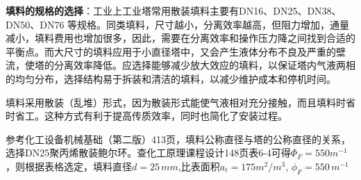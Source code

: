 \textbf{填料的规格的选择}：工业上工业塔常用散装填料主要有DN16、DN25、DN38、DN50、DN76 等规格。同类填料，尺寸越小，分离效率越高，但阻力增加，通量减小，填料费用也增加很多，因此，需要在分离效率和操作压力降之间找到合适的平衡点。而大尺寸的填料应用于小直径塔中，又会产生液体分布不良及严重的壁流，使塔的分离效率降低。应选择能够减少放大效应的填料，以保证塔内气液两相的均匀分布，选择结构易于拆装和清洁的填料，以减少维护成本和停机时间。

填料采用散装（乱堆）形式，因为散装形式能使气液相对充分接触，而且填料时省时省工。这种方式有利于提高传质效率，同时也简化了安装过程。

参考化工设备机械基础（第二版）413页，填料公称直径与塔的公称直径的关系，选择DN25聚丙烯散装鲍尔环。查化工原理课程设计148页表6-4可得$Φ_{F}=550 m^{-1} $，则根据表格选定，填料直径$d=25\,mm$,比表面积$a_{t}=175 m^{2}/m^{3}$, $\phi_{F}=550 \, m^{-1}$

